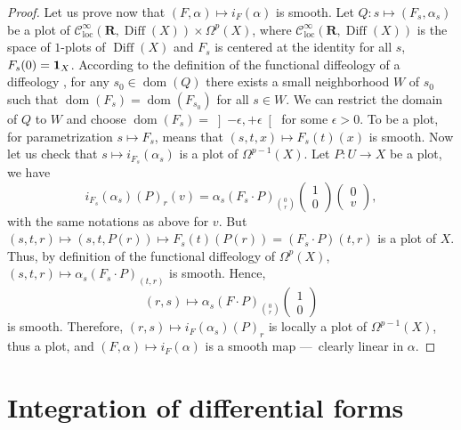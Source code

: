 \documentclass[11pt,reqno]{amsart}
\theoremstyle{definition}
\newcommand{\RR}{{\mathbf R}}
\def \F{{F}}
\def \P{{P}}
\def \Q{{Q}}
\def \U{{U}}
\def \W{{W}}
\def \X{{X}}
\newcommand{\cC}{{\mathcal C}}
\newcommand{\dom}{\operatorname{dom}}
\newcommand{\Cinf}{{\cC}^\infty}
\newcommand{\Diff}{\operatorname{Diff}}
\newcommand{\openinterval}[1]{\left] #1 \right[}
\newcommand{\id}{{\bf 1}}
\newcommand{\loc}{\mathrm{loc}}
\begin{document}
\begin{proof}
    Let us prove now that $(\F,\alpha) \mapsto i_\F(\alpha)$ is smooth. 
    Let $\Q : s \mapsto (\F_s,\alpha_s)$ be a
    plot of $\Cinf_\loc(\RR,\Diff(\X)) \times \Omega^p(\X)$, where $\Cinf_\loc(\RR,\Diff(\X))$ 
    is the space of $1$-plots of $\Diff(\X)$ and $\F_s$ is centered at the identity for all $s$, 
    $\F_s(0) = \id_\X$. According to the definition of the functional diffeology of a diffeology
    \cite{Piz05},
    for any $s_0 \in \dom(\Q)$ there exists a small neighborhood $\W$ of $s_0$ such that
    $\dom(\F_s) = \dom(\F_{s_0})$ for all $s \in \W$. We can restrict the domain of $\Q$ to $\W$ 
    and choose $\dom(\F_s) = \openinterval{-\epsilon, +\epsilon}$ for some $\epsilon >0$. 
    To be a plot, for parametrization $s \mapsto \F_s$, means that $(s,t,x) \mapsto \F_s(t)(x)$
    is smooth. Now let us check that $s \mapsto
      i_{\F_s}(\alpha_s)$ is a plot of $\Omega^{p-1}(\X)$. Let
    $\P : \U \to \X$ be a plot, we have 
    $$
      i_{\F_s}(\alpha_s)(\P)_r(v) =  \alpha_s(\F_s \cdot \P)_{0 \choose r}
      \begin{pmatrix}1 \\ 0\end{pmatrix} 
      \begin{pmatrix}0 \\ v\end{pmatrix}, 
      $$
    with the same notations as above for $v$. But
    $(s,t,r) \mapsto  (s,t,\P(r)) \mapsto  \F_s(t)(\P(r)) = (\F_s \cdot \P)(t,r)$ is a plot
    of $\X$. Thus, by definition of the functional diffeology of  $\Omega^p(\X)$, 
    $(s,t,r) \mapsto \alpha_s(\F_s \cdot \P)_{(t,r)}$ is smooth. Hence,
    $$ 
      (r,s) \mapsto \alpha_s(\F \cdot \P)_{0 \choose r} \begin{pmatrix}1 \\ 0\end{pmatrix}
      $$
    is smooth. Therefore, $(r,s) \mapsto 
      i_\F(\alpha_s)(\P)_r$ is locally a plot of
    $\Omega^{p-1}(\X)$, thus a plot, and $(\F,\alpha) \mapsto i_\F(\alpha)$ is a smooth map 
    ---~clearly linear in $\alpha$.
  \end{proof}
  
  
  \section{Integration of differential forms}
  \label{Section-Integration-of-differential-forms}
  
\end{document}
